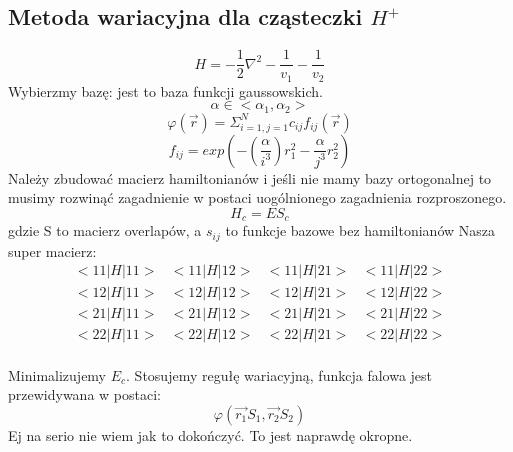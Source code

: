 \documentclass{article}
\begin{document}
		\subsection{Metoda wariacyjna dla cząsteczki $H^+$}
			$$H = -\frac{1}{2} \nabla^2 - \frac{1}{v_1} - \frac{1}{v_2}$$
			Wybierzmy bazę: jest to baza funkcji gaussowskich.
			$$\alpha \in <\alpha_1, \alpha_2>$$
			$$\varphi(\vec{r}) = \Sigma^N_{i=1, j=1} c_{ij}f_{ij}(\vec{r})$$
			$$f_{ij} = exp(-(\frac{\alpha}{i^3})r_1^2 - \frac{\alpha}{j^3}r_2^2)$$
			Należy zbudować macierz hamiltonianów i jeśli nie mamy bazy ortogonalnej to musimy rozwinąć zagadnienie w postaci uogólnionego zagadnienia rozproszonego.
			$$H_c = ES_c$$
			gdzie S to macierz overlapów, a $s_{ij}$ to funkcje bazowe bez hamiltonianów
			Nasza super macierz:
		$$	\begin{array}{cccc}
				<11|H|11> & <11|H|12> & <11|H|21> & <11|H|22> \\ 
				<12|H|11> & <12|H|12> & <12|H|21> &  <12|H|22>\\ 
				<21|H|11> & <21|H|12> & <21|H|21> &  <21|H|22>\\ 
				<22|H|11> & <22|H|12> & <22|H|21> &  <22|H|22>\\ 
			\end{array} $$
			
			Minimalizujemy $E_c$.
			Stosujemy regułę wariacyjną, funkcja falowa jest przewidywana w postaci:
			$$\varphi(\vec{r_1}S_1, \vec{r_2}S_2)$$
			Ej na serio nie wiem jak to dokończyć. To jest naprawdę okropne.
\end{document}
